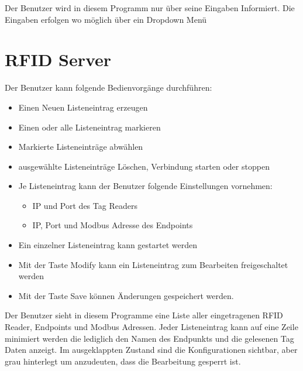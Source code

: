 Der Benutzer wird in diesem Programm nur über seine Eingaben Informiert.
Die Eingaben erfolgen wo möglich über ein Dropdown Menü

\section{RFID Server}

Der Benutzer kann folgende Bedienvorgänge durchführen:

\begin{itemize}
    \item Einen Neuen Listeneintrag erzeugen
    \item Einen oder alle Listeneintrag markieren
    \item Markierte Listeneinträge abwählen
    \item ausgewählte Listeneinträge Löschen, Verbindung starten oder stoppen
    \item Je Listeneintrag kann der Benutzer folgende Einstellungen vornehmen:
    \begin{itemize}
        \item IP und Port des Tag Readers
        \item IP, Port und Modbus Adresse des Endpoints
    \end{itemize}
    \item Ein einzelner Listeneintrag kann gestartet werden
    \item Mit der Taste \glqq Modify \grqq kann ein Listeneintrag zum Bearbeiten freigeschaltet werden
    \item Mit der Taste \glqq Save \grqq können Änderungen gespeichert werden.
\end{itemize}

Der Benutzer sieht in diesem Programme eine Liste aller eingetragenen RFID Reader, Endpoints und Modbus Adressen.
Jeder Listeneintrag kann auf eine Zeile minimiert werden die lediglich den Namen des Endpunkts und die gelesenen
Tag Daten anzeigt.
Im ausgeklappten Zustand sind die Konfigurationen sichtbar, aber grau hinterlegt um anzudeuten, dass die Bearbeitung
gesperrt ist.


